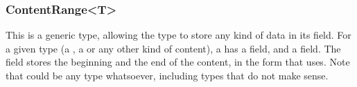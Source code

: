 \documentclass[../main.tex]{subfiles}
\begin{document}
\subsubsection{ContentRange<T>}
This is a generic type, allowing the type to store any kind of data in its field. For a given type  (a , a  or any other kind of content), a  has a  field, and a  field. The  field stores the beginning and the end of the content, in the  form that  uses. Note that  could be any type whatsoever, including types that do not make sense.
\end{document}
